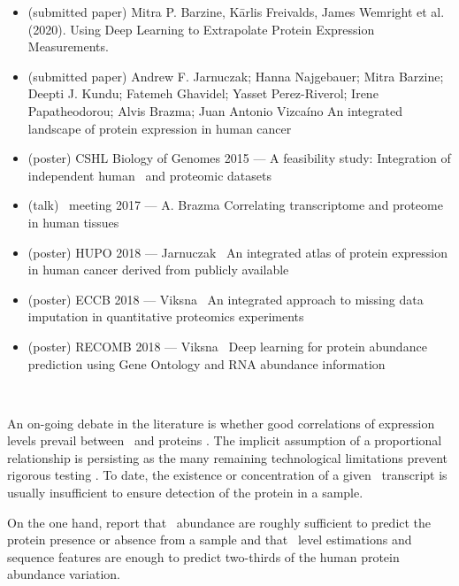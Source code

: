\clearpage
\derivativeWork{}
\begin{itemize}[topsep=0pt,nosep]
    \item (submitted paper) Mitra P. Barzine, K\={a}rlis Freivalds, James Wemright et al. (2020).
        Using Deep Learning to Extrapolate Protein Expression Measurements.
    \item (submitted paper) Andrew F. Jarnuczak; Hanna Najgebauer; Mitra Barzine;
        Deepti J. Kundu; Fatemeh Ghavidel; Yasset Perez-Riverol; Irene Papatheodorou; Alvis Brazma;
        Juan Antonio Vizcaíno An integrated landscape of protein expression in human cancer
    \item (poster) CSHL  Biology of Genomes 2015 --- A feasibility study:
        Integration of independent human \Rnaseq\ and proteomic datasets
    \item (talk) \gtex\ meeting 2017 --- A. Brazma Correlating transcriptome
        and proteome in human tissues
    \item (poster) HUPO 2018 --- Jarnuczak \etal\ An integrated atlas of
        protein expression in human cancer derived from publicly available
    \item (poster) ECCB 2018 --- Viksna \etal\ An integrated approach
        to missing data imputation in quantitative proteomics experiments
    \item (poster) RECOMB 2018 --- Viksna \etal\ Deep learning
        for protein abundance prediction using Gene Ontology and RNA abundance information
\end{itemize}

\clearpage\


An on-going debate in the literature is
whether good correlations of expression levels prevail
between \mRNAs\ and proteins .
The implicit assumption of a proportional relationship is persisting
as the many remaining technological limitations prevent
rigorous testing .
To date, the existence or concentration of a given \mRNA\ transcript
is usually insufficient to ensure detection of the protein in a sample.\mybr\

On the one hand,
\citet{Ramakrishnan2009-lv} report that
\mRNAs\ abundance are roughly sufficient to predict
the protein presence or absence from a sample and
\citet{Vogel2010-ux} that
\mRNA\ level estimations and sequence features are enough to predict
two-thirds of the human protein abundance variation.\mybr\


